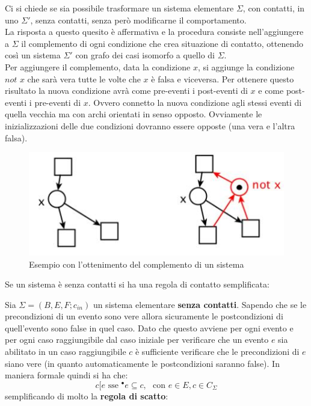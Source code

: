 \documentclass[a4paper,12pt, oneside]{book}
\begin{document}
Ci si chiede se sia possibile trasformare un sistema elementare $\Sigma$, con
contatti, in uno $\Sigma'$, senza contatti, senza però modificarne il
comportamento.\\
La risposta a questo quesito è affermativa e la procedura consiste
nell'aggiungere a $\Sigma$ il complemento di ogni condizione che crea situazione
di contatto, ottenendo così un sistema $\Sigma'$ con grafo dei casi isomorfo a
quello di $\Sigma$.\\ 
Per aggiungere il complemento, data la condizione $x$, si aggiunge la condizione
$not\,\, x$ che sarà vera tutte le volte che $x$ è falsa e viceversa. Per
ottenere questo risultato la nuova condizione avrà come pre-eventi i
post-eventi di $x$ e come post-eventi i pre-eventi di $x$. Ovvero
connetto la nuova condizione agli stessi eventi di quella vecchia ma con archi
orientati in senso opposto. Ovviamente le inizializzazioni delle due condizioni
dovranno essere opposte (una vera e l'altra falsa).
\begin{figure}[H]
  \centering
  \includegraphics[scale = 0.6]{img/con2.jpg}
  \caption{Esempio con l'ottenimento del complemento di un sistema}
\end{figure}
Se un sistema è senza contatti si ha una regola di contatto semplificata:
\begin{definizione}
  Sia $\Sigma = (B,E,F;c_{in})$ un sistema elementare \textbf{senza
    contatti}. Sapendo che se le precondizioni di un evento sono vere allora
  sicuramente le postcondizioni di quell'evento sono false in quel caso. Dato
  che questo avviene per ogni evento e per ogni caso raggiungibile dal caso
  iniziale per verificare che un evento $e$ sia abilitato in un caso
  raggiungibile $c$ è sufficiente verificare che le precondizioni di $e$ siano
  vere (in quanto automaticamente le postcondizioni saranno false). In
  maniera formale quindi si ha che: 
  \[c[e\mbox{ sse } ^\bullet e\subseteq c,\,\,\mbox{ con } e\in E,c\in
    C_\Sigma\]
  semplificando di molto la \textbf{regola di scatto}:
\end{definizione}
\end{document}
